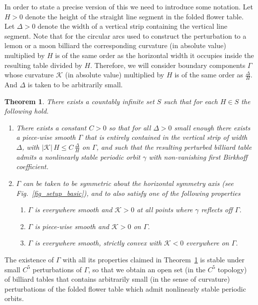\documentclass{amsart}
\theoremstyle{plain} %
\newtheorem{theorem}{Theorem}[section]
\begin{document}
In order to state a precise version of this we need to introduce some
notation. Let $H>0$ denote the height of the straight line segment in the
folded flower table. Let $\Delta>0$ denote the width of a vertical strip
containing the vertical line segment. Note that for the circular arcs
used to construct the perturbation to a lemon or a moon billiard
the corresponding curvature (in absolute value) multiplied by $H$
is of the same order as the horizontal width it occupies inside
the resulting table divided by $H$.
Therefore, we will consider boundary components $\Gamma$
whose curvature ${\mathcal K}$ (in absolute value)
multiplied by $H$ is of the same order as $\frac{\Delta}{H}$.
And $\Delta$ is taken to be arbitrarily small.
\begin{theorem}
  \label{thm_main}
  There exists a countably infinite set $S$
  such that for each $H \in S$ the following hold.
  \begin{enumerate}
    \item
      \label{item1_thm_main}
      There exists a constant $C>0$ so that
      for all $\Delta>0$ small enough there exists a
      piece-wise smooth $\Gamma$ that is
      entirely contained in the vertical strip of width $\Delta$,
      with
      $|{\mathcal K}|\,H \leq C\,\frac{\Delta}{H}$ on
      $\Gamma$, and such that the resulting perturbed billiard
      table admits a nonlinearly stable periodic orbit $\gamma$ with
      non-vanishing first Birkhoff coefficient.

    \item
      \label{item2_thm_main}
      $\Gamma$ can be taken to be symmetric about the
      horizontal symmetry axis (see Fig.~\ref{fig_setup_basic}), and
      to also satisfy one of the following properties
      \begin{enumerate}
 \item
   $\Gamma$ is everywhere smooth and
   ${\mathcal K} >0$ at all points where $\gamma$
   reflects off $\Gamma$.

 \item
   $\Gamma$ is piece-wise smooth and
   ${\mathcal K} >0$ on $\Gamma$.

 \item
   $\Gamma$ is everywhere smooth, strictly convex with
   ${\mathcal K} < 0$ everywhere on $\Gamma$.
      \end{enumerate}
  \end{enumerate}
\end{theorem}

The existence of $\Gamma$ with all its properties
claimed in Theorem~\ref{thm_main} is stable under small $C^5$ perturbations
of $\Gamma$,
so that we obtain an open set (in the $C^5$ topology) of billiard
tables that contains arbitrarily small (in the sense of curvature)
perturbations of the folded flower table which admit nonlinearly
stable periodic orbits.
\end{document}
